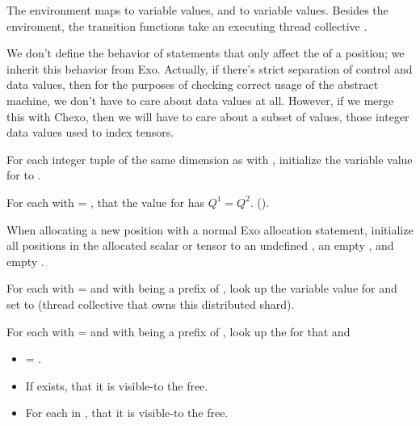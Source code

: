 \filbreak
{}

The environment maps  to  variable values, and  to  variable values.
Besides the enviroment, the transition functions take an executing thread collective .

\filbreak
We don't define the behavior of statements that only affect the  of a position; we inherit this behavior from Exo.
Actually, if there's strict separation of control and data values, then for the purposes of checking correct usage of the abstract machine, we don't have to care about data values at all.
However, if we merge this with Chexo, then we will have to care about a subset of values, those integer data values used to index tensors.

\filbreak
{} For each integer tuple  of the same dimension as  with , initialize the variable value for  to .

\filbreak
{} For each  with  = ,  that the  value for  has $Q^1 = Q^2$. ().

\filbreak
{} When allocating a new position with a normal Exo allocation statement, initialize all positions in the allocated scalar or tensor to an undefined , an empty , and empty .

\filbreak
{} For each  with  =  and with  being a prefix of , look up the  variable value for  and set  to  (thread collective that owns this distributed shard).

\filbreak
{} For each  with  =  and with  being a prefix of , look up the  for that  and
\begin{itemize}
  \item {}  = .
  \filbreak
  \item If  exists,  that it is visible-to the free.
  \filbreak
  \item For each  in ,  that it is visible-to the free.
\end{itemize}

